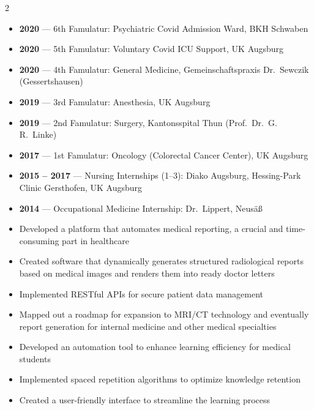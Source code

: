\documentclass[10pt,a4paper,ragged2e,withhyper]{altacv}
\begin{document}
\begin{paracol}{2}
\begin{itemize}
\item \textbf{2020} --- 6th Famulatur: Psychiatric Covid Admission Ward, BKH Schwaben
\item \textbf{2020} --- 5th Famulatur: Voluntary Covid ICU Support, UK Augsburg
\item \textbf{2020} --- 4th Famulatur: General Medicine, Gemeinschaftspraxis Dr.\ Sewczik (Gessertshausen)
\item \textbf{2019} --- 3rd Famulatur: Anesthesia, UK Augsburg
\item \textbf{2019} --- 2nd Famulatur: Surgery, Kantonsspital Thun (Prof.\ Dr.\ G.\,R.\ Linke)
\item \textbf{2017} --- 1st Famulatur: Oncology (Colorectal Cancer Center), UK Augsburg
\item \textbf{2015 -- 2017} --- Nursing Internships (1--3): Diako Augsburg, Hessing-Park Clinic Gersthofen, UK Augsburg
\item \textbf{2014} --- Occupational Medicine Internship: Dr.\ Lippert, Neusäß
\end{itemize}


\begin{itemize}
\item Developed a platform that automates medical reporting, a crucial and time-consuming part in healthcare
\item Created software that dynamically generates structured radiological reports based on medical images and renders them into ready doctor letters
\item Implemented RESTful APIs for secure patient data management
\item Mapped out a roadmap for expansion to MRI/CT technology and eventually report generation for internal medicine and other medical specialties
\end{itemize}

\divider

\begin{itemize}
\item Developed an automation tool to enhance learning efficiency for medical students
\item Implemented spaced repetition algorithms to optimize knowledge retention
\item Created a user-friendly interface to streamline the learning process
\end{itemize}


\end{paracol}
\end{document}
